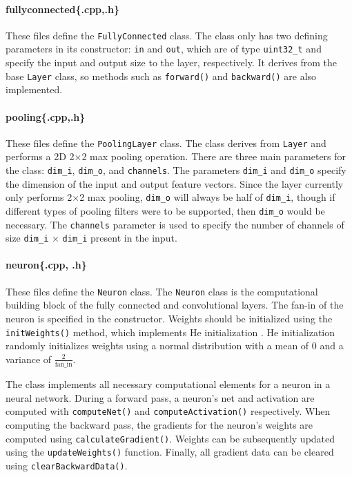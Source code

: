 \paragraph{fullyconnected\{.cpp,.h\}}
These files define the \texttt{FullyConnected} class. The class only has two defining parameters in its constructor: \texttt{in} and \texttt{out}, which are of type \texttt{uint32\_t} and specify the input and output size to the layer, respectively. It derives from the base \texttt{Layer} class, so methods such as \texttt{forward()} and \texttt{backward()} are also implemented.

\paragraph{pooling\{.cpp,.h\}}
These files define the \texttt{PoolingLayer} class. The class derives from \texttt{Layer} and performs a 2D 2$\times$2 max pooling operation. There are three main parameters for the class: \texttt{dim\_i}, \texttt{dim\_o}, and \texttt{channels}. The parameters \texttt{dim\_i} and \texttt{dim\_o} specify the dimension of the input and output feature vectors. Since the layer currently only performs 2$\times$2 max pooling, \texttt{dim\_o} will always be half of \texttt{dim\_i}, though if different types of pooling filters were to be supported, then \texttt{dim\_o} would be necessary. The \texttt{channels} parameter is used to specify the number of channels of size \texttt{dim\_i} $\times$ \texttt{dim\_i} present in the input.

\paragraph{neuron\{.cpp, .h\}}
These files define the \texttt{Neuron} class. The \texttt{Neuron} class is the computational building block of the fully connected and convolutional layers. The fan-in of the neuron is specified in the constructor. Weights should be initialized using the \texttt{initWeights()} method, which implements He initialization \cite{HeZR015}. He initialization randomly initializes weights using a normal distribution with a mean of 0 and a variance of $\frac{2}{\text{fan\_in}}$. 
\par 
The class implements all necessary computational elements for a neuron in a neural network. During a forward pass, a neuron's net and activation are computed with \texttt{computeNet()} and \texttt{computeActivation()} respectively. When computing the backward pass, the gradients for the neuron's weights are computed using \texttt{calculateGradient()}. Weights can be subsequently updated using the \texttt{updateWeights()} function. Finally, all gradient data can be cleared using \texttt{clearBackwardData()}.

